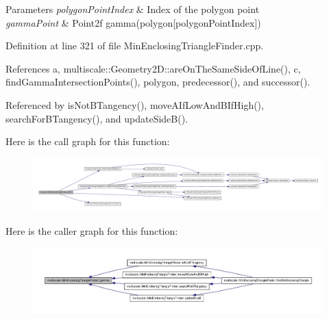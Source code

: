 \begin{DoxyParams}{\-Parameters}
{\em polygon\-Point\-Index} & \-Index of the polygon point \\
\hline
{\em gamma\-Point} & \-Point2f gamma(polygon\mbox{[}polygon\-Point\-Index\mbox{]}) \\
\hline
\end{DoxyParams}


\-Definition at line 321 of file \-Min\-Enclosing\-Triangle\-Finder.\-cpp.



\-References a, multiscale\-::\-Geometry2\-D\-::are\-On\-The\-Same\-Side\-Of\-Line(), c, find\-Gamma\-Intersection\-Points(), polygon, predecessor(), and successor().



\-Referenced by is\-Not\-B\-Tangency(), move\-A\-If\-Low\-And\-B\-If\-High(), search\-For\-B\-Tangency(), and update\-Side\-B().



\-Here is the call graph for this function\-:\nopagebreak
\begin{figure}[H]
\begin{center}
\leavevmode
\includegraphics[width=350pt]{classmultiscale_1_1MinEnclosingTriangleFinder_a800413be1e1567d986a92fac4a6b937e_cgraph}
\end{center}
\end{figure}




\-Here is the caller graph for this function\-:\nopagebreak
\begin{figure}[H]
\begin{center}
\leavevmode
\includegraphics[width=350pt]{classmultiscale_1_1MinEnclosingTriangleFinder_a800413be1e1567d986a92fac4a6b937e_icgraph}
\end{center}
\end{figure}


